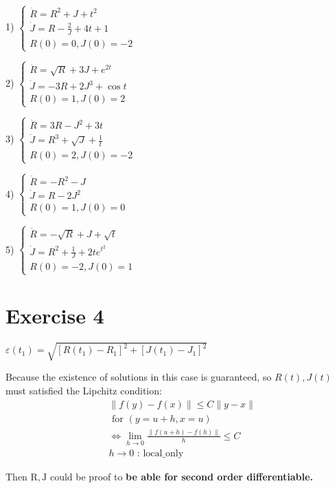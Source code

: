 \documentclass[a4paper]{article}
\begin{document}
1) $\left\{\begin{array}{l}\dot{R}=R^2+J+t^2 \\ \dot{J}=R-\frac{2}{J}+4 t+1 \\ R(0)=0, J(0)=-2\end{array}\right.$

2) $\left\{\begin{array}{l}\dot{R}=\sqrt{R}+3 J+e^{2 t} \\ \dot{J}=-3 R+2 J^3+\cos t \\ R(0)=1, J(0)=2\end{array}\right.$

3) $\left\{\begin{array}{l}\dot{R}=3 R-J^2+3 t \\ \dot{J}=R^3+\sqrt{J}+\frac{1}{t} \\ R(0)=2, J(0)=-2\end{array}\right.$

4) $\left\{\begin{array}{l}\dot{R}=-R^2-J \\ \dot{J}=R-2 J^2 \\ R(0)=1, J(0)=0\end{array}\right.$

5) $\left\{\begin{array}{l}\dot{R}=-\sqrt{R}+J+\sqrt{t} \\ \dot{J}=R^2+\frac{1}{J}+2 t e^{t^2} \\ R(0)=-2, J(0)=1\end{array}\right.$

\section{Exercise 4}
$\varepsilon\left(t_{1}\right)=\sqrt{\left[R\left(t_{1}\right)-R_{1}\right]^{2}+\left[J\left(t_{1}\right)-J_{1}\right]^{2}}$

Because the existence of solutions in this case is guaranteed, so $R(t), J(t)$ must satisfied the Lipchitz condition:
$$
\begin{aligned}
	&\|f(y)-f(x)\| \leq C\|y-x\| \\
	&\text { for }(y=u+h, x=u) \\
	&\Leftrightarrow \lim _{h \rightarrow 0} \frac{\|f(u+h)-f(h)\|}{h} \leq C \\
	&h \rightarrow 0 \text { : local\_only }
\end{aligned}
$$

Then $\mathrm{R}, \mathrm{J}$ could be proof to \textbf{be able for second order differentiable.} 
\end{document}
